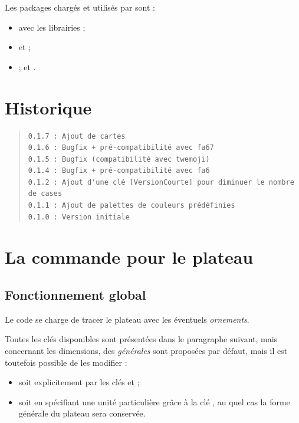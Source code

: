 \documentclass[11pt,a4paper]{ltxdoc}
\begin{document}
Les packages chargés et utilisés par  sont :

\begin{itemize}
	\item {} avec les librairies  ;
	\item {} et  ;
	\item {} ;  et .
\end{itemize}

\pagebreak

\section{Historique}

\begin{quote}
\begin{verbatim}
0.1.7 : Ajout de cartes
0.1.6 : Bugfix + pré-compatibilité avec fa67
0.1.5 : Bugfix (compatibilité avec twemoji)
0.1.4 : Bugfix + pré-compatibilité avec fa6
0.1.2 : Ajout d'une clé [VersionCourte] pour diminuer le nombre de cases
0.1.1 : Ajout de palettes de couleurs prédéfinies
0.1.0 : Version initiale
\end{verbatim}
\end{quote}

\pagebreak

\section{La commande pour le plateau}

\subsection{Fonctionnement global}

Le code se charge de tracer le plateau avec les éventuels \textit{ornements}.

Toutes les clés disponibles sont présentées dans le paragraphe suivant, mais concernant les dimensions, des \textit{générales} sont proposées par défaut, mais il est toutefois possible de les modifier :

\begin{itemize}
	\item soit explicitement par les clés \MontreCode{[Rayon=...]} et \MontreCode{[HauteurCases=...]} ;
	\item soit en spécifiant une unité particulière grâce à la clé \MontreCode{[Unite=...]}, au quel cas la forme générale du plateau sera conservée.
\end{itemize}
\end{document}
